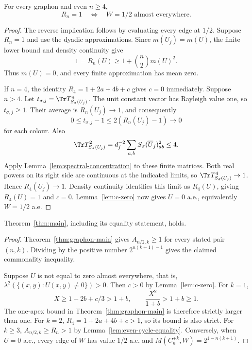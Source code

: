 \begin{lemma}
\label{lem:even-cycle-equality}
\proved For every graphon and even $n\ge4$,
\[
 R_n=1\quad\Longleftrightarrow\quad W=1/2\text{ almost everywhere}.
\]
\end{lemma}
\begin{proof}
The reverse implication follows by evaluating every edge at $1/2$.  Suppose $R_n=1$ and
use the dyadic approximations.  Since $m(U_j)=m(U)$, the finite lower bound and density
continuity give
\[
 1=R_n(U)\ge1+\binom n2m(U)^2.
\]
Thus $m(U)=0$, and every finite approximation has mean zero.

If $n=4$, the identity $R_4=1+2a+4b+c$ gives $c=0$ immediately.  Suppose $n>4$.
Let $t_{\sigma,j}=\Tr T_{S_\sigma(U_j)}^n$.  The unit constant vector has Rayleigh value one,
so $t_{\sigma,j}\ge1$.  Their average is $R_n(U_j)\to1$, and consequently
\[
 0\le t_{\sigma,j}-1\le2(R_n(U_j)-1)\longrightarrow0
\]
for each colour.  Also
\[
 \Tr T_{S_\sigma(U_j)}^2
 =d_j^{-2}\sum_{a,b}S_\sigma(\overline U_j)_{ab}^2\le4.
\]
Apply Lemma~\ref{lem:spectral-concentration} to these finite matrices.  Both real powers
on its right side are continuous at the indicated limits, so
$\Tr T_{S_\sigma(U_j)}^4\to1$.  Hence $R_4(U_j)\to1$.
Density continuity identifies this limit as $R_4(U)$, giving $R_4(U)=1$ and $c=0$.
Lemma~\ref{lem:c-zero} now gives $U=0$ a.e., equivalently $W=1/2$ a.e.
\end{proof}

\begin{corollary}
\label{cor:main-equality}
\proved Theorem~\ref{thm:main}, including its equality statement, holds.
\end{corollary}
\begin{proof}
Theorem~\ref{thm:graphon-main} gives $A_{n/2,k}\ge1$ for every stated pair $(n,k)$.
Dividing by the positive number $2^{n(k+1)-1}$ gives the claimed commonality inequality.

Suppose $U$ is not equal to zero almost everywhere, that is,
$\lambda^2(\{(x,y):U(x,y)\ne0\})>0$.  Then $c>0$ by Lemma~\ref{lem:c-zero}.  For $k=1$,
\[
 X\ge1+2b+c/3>1+b,
 \qquad\frac{X^2}{1+b}>1+b\ge1.
\]
The one-apex bound in Theorem~\ref{thm:graphon-main} is therefore strictly larger than one.
For $k=2$, $R_4=1+2a+4b+c>1$, so its bound is also strict.
For $k\ge3$, $A_{n/2,k}\ge R_n>1$ by Lemma~\ref{lem:even-cycle-equality}.
Conversely, when $U=0$ a.e., every edge of $W$ has value $1/2$ a.e. and
$M(C_n^{+k},W)=2^{1-n(k+1)}$.
\end{proof}

